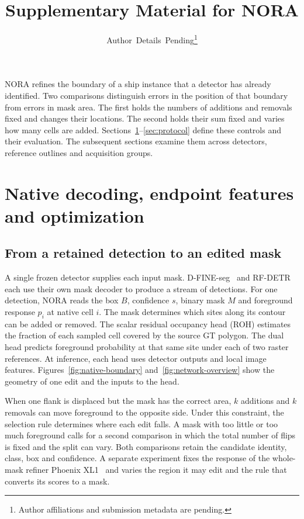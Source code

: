 \documentclass[journal]{IEEEtran}
\begin{document}
\renewcommand{\thesection}{S\arabic{section}}
\ifdefined\thesectiondis{}\fi
\renewcommand{\theequation}{S\arabic{equation}}
\renewcommand{\thefigure}{S\arabic{figure}}
\renewcommand{\thetable}{S\arabic{table}}
\raggedbottom
\title{Supplementary Material for NORA}
\author{Author~Details~Pending\thanks{Author affiliations and submission metadata are pending.}}
\maketitle

NORA refines the boundary of a ship instance that a detector has already identified. Two comparisons distinguish errors in the position of that boundary from errors in mask area. The first holds the numbers of additions and removals fixed and changes their locations. The second holds their sum fixed and varies how many cells are added. Sections~\ref{sec:method}--\ref{sec:protocol} define these controls and their evaluation. The subsequent sections examine them across detectors, reference outlines and acquisition groups.

\section{Native decoding, endpoint features and optimization}
\label{sec:method}

\subsection{From a retained detection to an edited mask}

A single frozen detector supplies each input mask. D-FINE-seg~\cite{dfine} and RF-DETR~\cite{rfdetr} each use their own mask decoder to produce a stream of detections. For one detection, NORA reads the box \(B\), confidence \(s\), binary mask \(M\) and foreground response \(p_i\) at native cell \(i\). The mask determines which sites along its contour can be added or removed. The scalar residual occupancy head (ROH) estimates the fraction of each sampled cell covered by the source GT polygon. The dual head predicts foreground probability at that same site under each of two raster references. At inference, each head uses detector outputs and local image features. Figures~\ref{fig:native-boundary} and~\ref{fig:network-overview} show the geometry of one edit and the inputs to the head.

When one flank is displaced but the mask has the correct area, \(k\) additions and \(k\) removals can move foreground to the opposite side. Under this constraint, the selection rule determines where each edit falls. A mask with too little or too much foreground calls for a second comparison in which the total number of flips is fixed and the split can vary. Both comparisons retain the candidate identity, class, box and confidence. A separate experiment fixes the response of the whole-mask refiner Phoenix XL1~\cite{phoenix} and varies the region it may edit and the rule that converts its scores to a mask.
\end{document}
